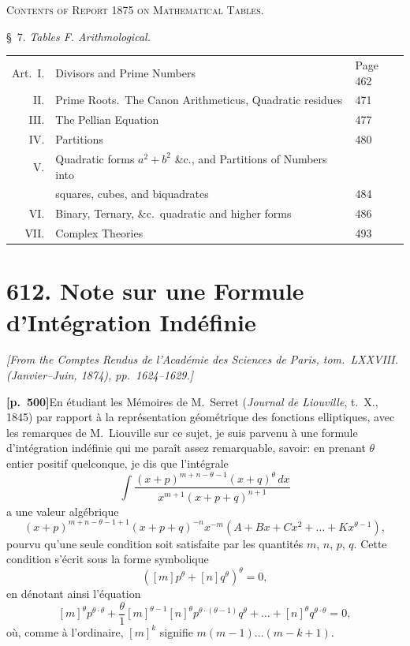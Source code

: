 \documentclass[11pt,a4paper]{article}
\begin{document}
\bigskip
\begin{center}
\textsc{Contents of Report 1875 on Mathematical Tables.}
\end{center}
\noindent\S~7. \textit{Tables F. Arithmological.}
\begin{center}
\begin{tabular}{rll}
Art.~I. & Divisors and Prime Numbers & Page 462 \\
II. & Prime Roots.\ The Canon Arithmeticus, Quadratic residues & 471 \\
III. & The Pellian Equation & 477 \\
IV. & Partitions & 480 \\
V. & Quadratic forms $a^{2} + b^{2}$ \&c., and Partitions of Numbers into & \\
 & squares, cubes, and biquadrates & 484 \\
VI. & Binary, Ternary, \&c.\ quadratic and higher forms & 486 \\
VII. & Complex Theories & 493 \\
\end{tabular}
\end{center}

\newpage

\section*{\textbf{612.} Note sur une Formule d'Int\'egration Ind\'efinie}

\textit{[From the Comptes Rendus de l'Acad\'emie des Sciences de Paris, tom.~LXXVIII. (Janvier--Juin, 1874), pp.~1624--1629.]}

\bigskip

\noindent\textbf{[p.~500]}\quad En \'etudiant les M\'emoires de M.~Serret (\textit{Journal de Liouville}, t.~X., 1845) par rapport \`a la repr\'esentation g\'eom\'etrique des fonctions elliptiques, avec les remarques de M.~Liouville sur ce sujet, je suis parvenu \`a une formule d'int\'egration ind\'efinie qui me para\^it assez remarquable, savoir: en prenant $\theta$ entier positif quelconque, je dis que l'int\'egrale
\[
\int \frac{(x + p)^{m + n - \theta - 1}(x + q)^{\theta}\,dx}{x^{m + 1}(x + p + q)^{n + 1}}
\]
a une valeur alg\'ebrique
\[
(x + p)^{m + n - \theta - 1 + 1}(x + p + q)^{-n} x^{-m} (A + Bx + Cx^{2} + \ldots + Kx^{\theta - 1}),
\]
pourvu qu'une seule condition soit satisfaite par les quantit\'es $m$, $n$, $p$, $q$. Cette condition s'\'ecrit sous la forme symbolique
\[
([m]p^{\theta} + [n]q^{\theta})^{\theta} = 0,
\]
en d\'enotant ainsi l'\'equation
\[
[m]^{\theta} p^{\theta\cdot\theta} + \frac{\theta}{1}[m]^{\theta - 1}[n]^{\theta} p^{\theta\cdot(\theta - 1)} q^{\theta} + \ldots + [n]^{\theta} q^{\theta\cdot\theta} = 0,
\]
o\`u, comme \`a l'ordinaire, $[m]^{k}$ signifie $m(m - 1)\ldots(m - k + 1)$.
\end{document}
